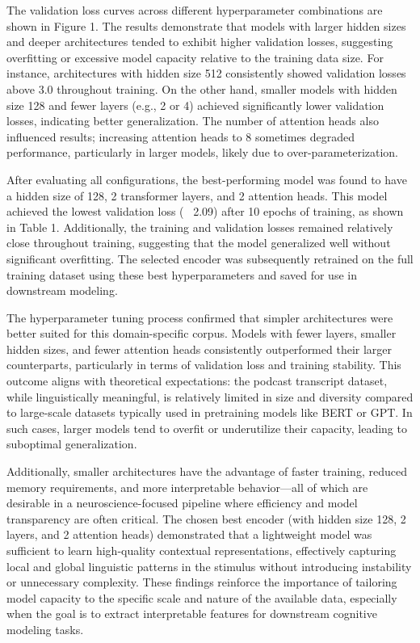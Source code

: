 \documentclass[11pt,letterpaper]{article}
\begin{document}
The validation loss curves across different hyperparameter combinations are shown in Figure 1. The results demonstrate that models with larger hidden sizes and deeper architectures tended to exhibit higher validation losses, suggesting overfitting or excessive model capacity relative to the training data size. For instance, architectures with hidden size 512 consistently showed validation losses above 3.0 throughout training. On the other hand, smaller models with hidden size 128 and fewer layers (e.g., 2 or 4) achieved significantly lower validation losses, indicating better generalization. The number of attention heads also influenced results; increasing attention heads to 8 sometimes degraded performance, particularly in larger models, likely due to over-parameterization.

After evaluating all configurations, the best-performing model was found to have a hidden size of 128, 2 transformer layers, and 2 attention heads. This model achieved the lowest validation loss (~ 2.09) after 10 epochs of training, as shown in Table 1. Additionally, the training and validation losses remained relatively close throughout training, suggesting that the model generalized well without significant overfitting. The selected encoder was subsequently retrained on the full training dataset using these best hyperparameters and saved for use in downstream modeling.

The hyperparameter tuning process confirmed that simpler architectures were better suited for this domain-specific corpus. Models with fewer layers, smaller hidden sizes, and fewer attention heads consistently outperformed their larger counterparts, particularly in terms of validation loss and training stability. This outcome aligns with theoretical expectations: the podcast transcript dataset, while linguistically meaningful, is relatively limited in size and diversity compared to large-scale datasets typically used in pretraining models like BERT or GPT. In such cases, larger models tend to overfit or underutilize their capacity, leading to suboptimal generalization.

Additionally, smaller architectures have the advantage of faster training, reduced memory requirements, and more interpretable behavior—all of which are desirable in a neuroscience-focused pipeline where efficiency and model transparency are often critical. The chosen best encoder (with hidden size 128, 2 layers, and 2 attention heads) demonstrated that a lightweight model was sufficient to learn high-quality contextual representations, effectively capturing local and global linguistic patterns in the stimulus without introducing instability or unnecessary complexity. These findings reinforce the importance of tailoring model capacity to the specific scale and nature of the available data, especially when the goal is to extract interpretable features for downstream cognitive modeling tasks.
\end{document}
